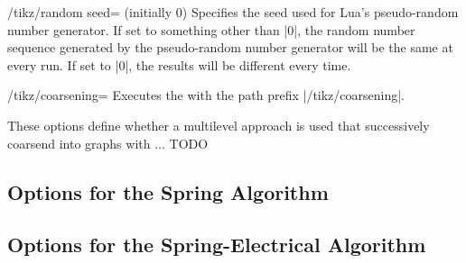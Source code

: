 \begin{key}{/tikz/random seed= (initially 0)}
  Specifies the seed used for Lua's pseudo-random number generator. If
  set to something other than |0|, the random number sequence generated
  by the pseudo-random number generator will be the same at every run.
  If set to |0|, the results will be different every time.
\end{key}

\begin{key}{/tikz/coarsening=}
  Executes the  with the path prefix |/tikz/coarsening|.
  
  These options define whether a multilevel approach is used that
  successively coarsend into graphs with ... TODO
\end{key}

\subsection{Options for the Spring Algorithm}

\subsection{Options for the Spring-Electrical Algorithm}


